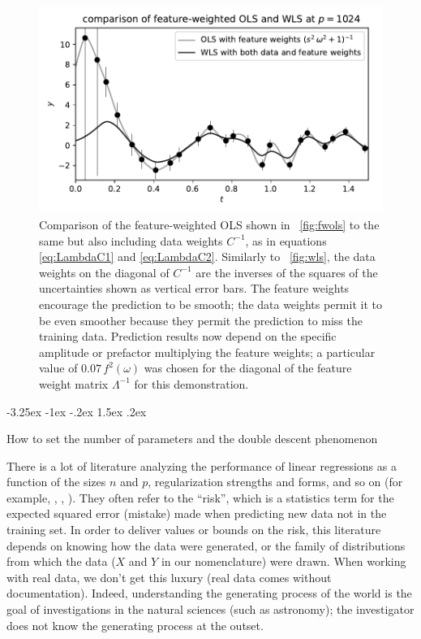 \documentclass[12pt,letterpaper]{article}
\makeatletter
\newlength{\figurewidth}
\renewcommand\section{\@startsection {section}{1}{\z@}%
  {-3.25ex \@plus -1ex \@minus -.2ex}%
  {1.5ex \@plus .2ex}%
  {\raggedright\normalfont\large\bfseries}}
\makeatother
\begin{document}
\begin{figure}[t]
    \begin{mdframed}
    \includegraphics[width=\figurewidth]{./weighted-WLS.pdf}
    \caption{Comparison of the feature-weighted OLS shown in \figurename~\ref{fig:fwols} to the same but also including data weights $C^{-1}$, as in equations \eqref{eq:LambdaC1} and \eqref{eq:LambdaC2}.
    Similarly to \figurename~\ref{fig:wls}, the data weights on the diagonal of $C^{-1}$ are the inverses of the squares of the uncertainties shown as vertical error bars. The feature weights encourage the prediction to be smooth; the data weights permit it to be even smoother because they permit the prediction to miss the training data.
    Prediction results now depend on the specific amplitude or prefactor multiplying the feature weights; a particular value of $0.07\,f^2(\omega)$ was chosen for the diagonal of the feature weight matrix $\Lambda^{-1}$ for this demonstration.}
    \label{fig:fwwls}
    \end{mdframed}
\end{figure}

\section{How to set the number of parameters and the double descent phenomenon}
\label{sec:dd}

There is a lot of literature analyzing the performance of linear regressions as a function of the sizes $n$ and $p$, regularization strengths and forms, and so on (for example, \citealt{dobriban2018high}, \citealt{bartlett2020benign}, \citealt{hastie2019surprises}).
They often refer to the ``risk'', which is a statistics term for the expected squared error (mistake) made when predicting new data not in the training set.
In order to deliver values or bounds on the risk, this literature depends on knowing how the data were generated, or the family of distributions from which the data ($X$ and $Y$ in our nomenclature) were drawn.
When working with real data, we don't get this luxury (real data comes without documentation).
Indeed, understanding the generating process of the world is the goal of investigations in the natural sciences (such as astronomy); the investigator does not know the generating process at the outset.
\end{document}
